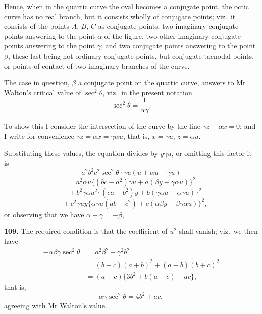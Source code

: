 \documentclass[11pt,a4paper]{article}
\theoremstyle{plain}
\begin{document}
Hence, when in the quartic curve the oval becomes a conjugate point, the octic curve has no real branch, but it consists wholly of conjugate points; viz.\ it consists of the points $A$, $B$, $C$ as conjugate points; two imaginary conjugate points answering to the point $\alpha$ of the figure, two other imaginary conjugate points answering to the point $\gamma$; and two conjugate points answering to the point $\beta$, these last being not ordinary conjugate points, but conjugate tacnodal points, or points of contact of two imaginary branches of the curve.

The case in question, $\beta$ a conjugate point on the quartic curve, answers to Mr Walton's critical value of $\sec^2\theta$, viz.\ in the present notation
\[
\sec^2\theta = \frac{1}{\alpha\gamma}.
\]

To show this I consider the intersection of the curve by the line $\gamma z - \alpha x = 0$; and I write for convenience $\gamma z = \alpha x = \gamma\alpha u$, that is, $x = \gamma u$, $z = \alpha u$.

Substituting these values, the equation divides by $y\gamma u$, or omitting this factor it is
\[
a^2b^2c^2\sec^2\theta\cdot \gamma u(u + \alpha u + \gamma u)
\]
\[
= a^2\alpha u\{(bc - a^2)\gamma u + a(\beta y - \gamma\alpha u)\}^2
\]
\[
\quad {}+ b^2\gamma\alpha u^2\{(ca - b^2)y + b(\gamma\alpha u - \alpha\gamma u)\}^2
\]
\[
\quad {}+ c^2\gamma uy\{\alpha\gamma u(ab - c^2) + c(\alpha\beta y - \beta\gamma\alpha u)\}^2,
\]
or observing that we have $\alpha + \gamma = -\beta$,

\noindent\textbf{109.} The required condition is that the coefficient of $u^2$ shall vanish; viz.\ we then have
\begin{align*}
-\alpha\beta\gamma\sec^2\theta &= a^2\beta^2 + \gamma^2b^2 \\
&= (b - c)(a + b)^2 + (a - b)(b + c)^2 \\
&= (a - c)\{3b^2 + b(a + c) - ac\},
\end{align*}
that is,
\[
\alpha\gamma\sec^2\theta = 4b^2 + ac,
\]
agreeing with Mr Walton's value.
\end{document}
